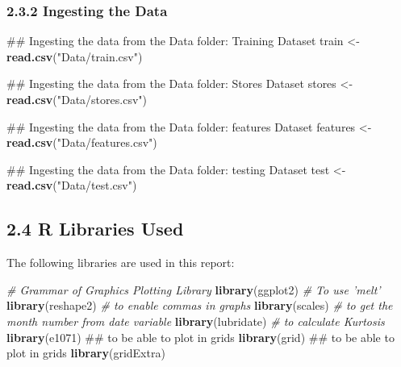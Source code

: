 \documentclass[]{article}
\newenvironment{Shaded}{\begin{snugshade}}{\end{snugshade}}
\newcommand{\KeywordTok}[1]{\textcolor[rgb]{0.13,0.29,0.53}{\textbf{{#1}}}}
\newcommand{\StringTok}[1]{\textcolor[rgb]{0.31,0.60,0.02}{{#1}}}
\newcommand{\CommentTok}[1]{\textcolor[rgb]{0.56,0.35,0.01}{\textit{{#1}}}}
\newcommand{\NormalTok}[1]{{#1}}
\begin{document}
\subsubsection{2.3.2 Ingesting the Data}\label{ingesting-the-data}

\begin{Shaded}
\begin{Highlighting}[]
\NormalTok{## Ingesting the data from the Data folder: Training Dataset}
\NormalTok{train <-}\StringTok{ }\KeywordTok{read.csv}\NormalTok{(}\StringTok{"Data/train.csv"}\NormalTok{)}
\end{Highlighting}
\end{Shaded}

\begin{Shaded}
\begin{Highlighting}[]
\NormalTok{## Ingesting the data from the Data folder: Stores Dataset}
\NormalTok{stores <-}\StringTok{ }\KeywordTok{read.csv}\NormalTok{(}\StringTok{"Data/stores.csv"}\NormalTok{)}
\end{Highlighting}
\end{Shaded}

\begin{Shaded}
\begin{Highlighting}[]
\NormalTok{## Ingesting the data from the Data folder: features Dataset}
\NormalTok{features <-}\StringTok{ }\KeywordTok{read.csv}\NormalTok{(}\StringTok{"Data/features.csv"}\NormalTok{)}
\end{Highlighting}
\end{Shaded}

\begin{Shaded}
\begin{Highlighting}[]
\NormalTok{## Ingesting the data from the Data folder: testing Dataset}
\NormalTok{test <-}\StringTok{ }\KeywordTok{read.csv}\NormalTok{(}\StringTok{"Data/test.csv"}\NormalTok{)}
\end{Highlighting}
\end{Shaded}

\subsection{2.4 R Libraries Used}\label{r-libraries-used}

The following libraries are used in this report:

\begin{Shaded}
\begin{Highlighting}[]
\CommentTok{# Grammar of Graphics Plotting Library}
\KeywordTok{library}\NormalTok{(ggplot2)}
\CommentTok{# To use 'melt'}
\KeywordTok{library}\NormalTok{(reshape2)}
\CommentTok{# to enable commas in graphs}
\KeywordTok{library}\NormalTok{(scales)}
\CommentTok{# to get the month number from date variable}
\KeywordTok{library}\NormalTok{(lubridate)}
\CommentTok{# to calculate Kurtosis}
\KeywordTok{library}\NormalTok{(e1071)}
\NormalTok{## to be able to plot in grids}
\KeywordTok{library}\NormalTok{(grid)}
\NormalTok{## to be able to plot in grids}
\KeywordTok{library}\NormalTok{(gridExtra)}
\end{Highlighting}
\end{Shaded}
\end{document}
